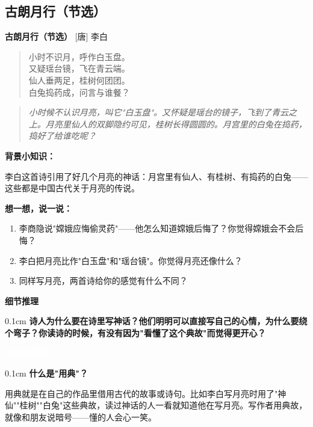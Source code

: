 \documentclass[a4paper,12pt]{ctexart}
\newcommand{\thinktitle}{%
  \vspace{0.3cm}
  {\large\textcolor{orange!80!black}{\textbf{想一想，说一说：}}}
}
\newcommand{\genrebox}[1]{%
  \vspace{0.2cm}
  \noindent\colorbox{purple!60!white}{\textcolor{white}{\small\textbf{\hspace{0.3cm}文体小知识\hspace{0.3cm}}}}
  \par #1
}
\newcommand{\inferbox}[1]{%
  \vspace{0.2cm}
  \noindent\colorbox{orange!40!white}{\textcolor{black!80!white}{\small\textbf{\hspace{0.3cm}细节推理\hspace{0.3cm}}}}
  \par #1
}
\begin{document}
\subsection*{\textcolor{teal!80!black}{古朗月行（节选）}}

\begin{center}
\large
\textbf{古朗月行（节选）} \hspace{2cm} [唐] 李白
\end{center}

\begin{quote}
\large
小时不识月，呼作白玉盘。\\
又疑瑶台镜，飞在青云端。\\
仙人垂两足，桂树何团团。\\
白兔捣药成，问言与谁餐？
\end{quote}

\vspace{0.3cm}

\begin{quote}
\textit{小时候不认识月亮，叫它"白玉盘"。又怀疑是瑶台的镜子，飞到了青云之上。月亮里仙人的双脚隐约可见，桂树长得圆圆的。月宫里的白兔在捣药，捣好了给谁吃呢？}
\end{quote}

\vspace{0.3cm}

\textbf{背景小知识：}

李白这首诗引用了好几个月亮的神话：月宫里有仙人、有桂树、有捣药的白兔——这些都是中国古代关于月亮的传说。

\vspace{0.5cm}

\thinktitle
\begin{enumerate}
  \item 李商隐说"嫦娥应悔偷灵药"——他怎么知道嫦娥后悔了？你觉得嫦娥会不会后悔？
  \item 李白把月亮比作"白玉盘"和"瑶台镜"。你觉得月亮还像什么？
  \item 同样写月亮，两首诗给你的感觉有什么不同？
\end{enumerate}

\inferbox
\vspace{0.1cm}
\noindent
\textbf{诗人为什么要在诗里写神话？他们明明可以直接写自己的心情，为什么要绕个弯子？你读诗的时候，有没有因为"看懂了这个典故"而觉得更开心？}

\genrebox
\vspace{0.1cm}
\noindent
\textbf{什么是"用典"？}

用典就是在自己的作品里借用古代的故事或诗句。比如李白写月亮时用了"神仙""桂树""白兔"这些典故，读过神话的人一看就知道他在写月亮。写作者用典故，就像和朋友说暗号——懂的人会心一笑。
\end{document}
